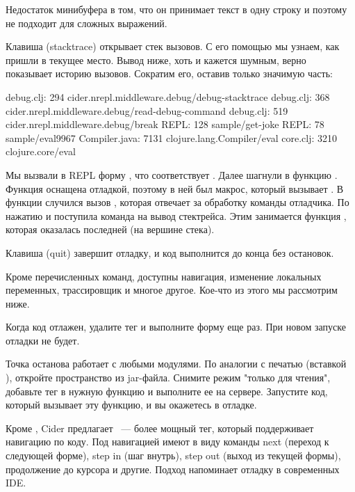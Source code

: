Недостаток минибуфера в том, что он принимает текст в одну строку и поэтому не подходит для сложных выражений.

Клавиша  (stacktrace) открывает стек вызовов. С его помощью мы узнаем, как пришли в текущее место. Вывод ниже, хоть и кажется шумным, верно показывает историю вызовов. Сократим его, оставив только значимую часть:

\begin{english}
  \begin{text}
    debug.clj:  294  cider.nrepl.middleware.debug/debug-stacktrace
    debug.clj:  368  cider.nrepl.middleware.debug/read-debug-command
    debug.clj:  519  cider.nrepl.middleware.debug/break
         REPL:  128  sample/get-joke
         REPL:   78  sample/eval9967
Compiler.java: 7131  clojure.lang.Compiler/eval
     core.clj: 3210  clojure.core/eval
  \end{text}
\end{english}

Мы вызвали в REPL форму , что соответствует . Далее шагнули в функцию . Функция оснащена отладкой, поэтому в ней был макрос, который вызывает . В функции  случился вызов , которая отвечает за обработку команды отладчика. По нажатию  и поступила команда на вывод стектрейса. Этим занимается функция , которая оказалась последней (на вершине стека).

Клавиша  (quit) завершит отладку, и код выполнится до конца без остановок.

Кроме перечисленных команд, доступны навигация, изменение локальных переменных, трассировщик и многое другое. Кое-что из этого мы рассмотрим ниже.

Когда код отлажен, удалите тег  и выполните форму еще раз. При новом запуске отладки не будет.

Точка останова работает с любыми модулями. По аналогии с печатью (вставкой ), откройте пространство из jar-файла. Снимите режим "только для чтения", добавьте тег  в нужную функцию и выполните ее на сервере. Запустите код, который вызывает эту функцию, и вы окажетесь в отладке.

Кроме , Cider предлагает ~--- более мощный тег, который поддерживает навигацию по коду. Под навигацией имеют в виду команды next (переход к следующей форме), step in (шаг внутрь), step out (выход из текущей формы), продолжение до курсора и другие. Подход напоминает отладку в современных IDE.

